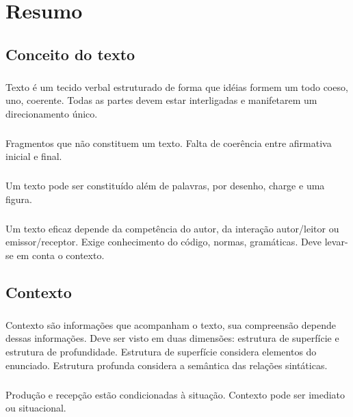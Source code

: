 \chapter{Resumo}
\section{Conceito do texto}
\paragraph{}
Texto é um tecido verbal estruturado de forma que idéias formem um todo coeso, uno, coerente. Todas as partes devem estar interligadas e manifetarem um direcionamento único.

\paragraph{}
Fragmentos que não constituem um texto. Falta de coerência entre afirmativa inicial e final.

\paragraph{}
Um texto pode ser constituído além de palavras, por desenho, charge e uma figura.

\paragraph{}
Um texto eficaz depende da competência do autor, da interação autor/leitor ou  emissor/receptor. Exige conhecimento do código, normas, gramáticas. Deve levar-se em conta o contexto.

\section{Contexto}

\paragraph{}
Contexto são informações que acompanham o texto, sua compreensão depende dessas informações. Deve ser visto em duas dimensões: estrutura de superfície e estrutura de profundidade. Estrutura de superfície considera elementos do enunciado. Estrutura profunda considera a semântica das relações sintáticas.

\paragraph{}
Produção e recepção estão condicionadas à situação. Contexto pode ser imediato ou situacional.

